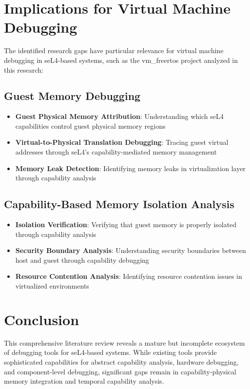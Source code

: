 \documentclass[11pt,a4paper]{article}
\begin{document}
\begin{subsubsection}
\section{Implications for Virtual Machine Debugging}

The identified research gaps have particular relevance for virtual machine debugging in seL4-based systems, such as the vm\_freertos project analyzed in this research:

\subsection{Guest Memory Debugging}
\begin{itemize}
\item \textbf{Guest Physical Memory Attribution}: Understanding which seL4 capabilities control guest physical memory regions
\item \textbf{Virtual-to-Physical Translation Debugging}: Tracing guest virtual addresses through seL4's capability-mediated memory management
\item \textbf{Memory Leak Detection}: Identifying memory leaks in virtualization layer through capability analysis
\end{itemize}

\subsection{Capability-Based Memory Isolation Analysis}
\begin{itemize}
\item \textbf{Isolation Verification}: Verifying that guest memory is properly isolated through capability analysis
\item \textbf{Security Boundary Analysis}: Understanding security boundaries between host and guest through capability debugging
\item \textbf{Resource Contention Analysis}: Identifying resource contention issues in virtualized environments
\end{itemize}

\section{Conclusion}

This comprehensive literature review reveals a mature but incomplete ecosystem of debugging tools for seL4-based systems. While existing tools provide sophisticated capabilities for abstract capability analysis, hardware debugging, and component-level debugging, significant gaps remain in capability-physical memory integration and temporal capability analysis.


\end{subsubsection}
\end{document}
